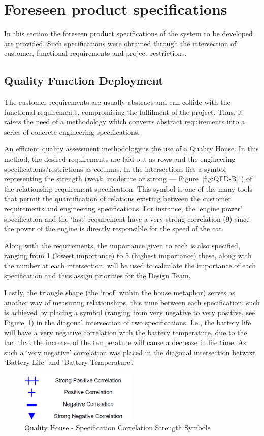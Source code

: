 \section{Foreseen product specifications}%
\label{sec:org31f7574}
In this section the foreseen product specifications of the system to be developed are provided. Such specifications were obtained through the intersection of customer, functional requirements and project restrictions.
\subsection{Quality Function Deployment}%
\label{sec:qfd}
The customer requirements are usually abstract and can collide with the functional requirements, compromising the fulfilment of the project. Thus, it raises the need of a methodology which converts abstract requirements into a series of concrete engineering specifications.

An efficient quality assessment methodology is the use of a Quality House. In this method, the desired requirements are laid out as rows and the engineering specifications/restrictions as columns. In the intersections lies a symbol representing the strength (weak, moderate or strong --- Figure~\ref{fig:QFD-R} ) of the relationship requirement-specification. This symbol is one of the many tools that permit the quantification of relations existing between the customer requirements and engineering specifications.
For instance, the `engine power' specification and the `fast' requirement have a
very strong correlation (9) since the power of the engine is directly
responsible for the speed of the car.

Along with the requirements, the importance given to each is also specified, ranging from 1 (lowest importance) to 5 (highest importance) these, along with the number at each intersection, will be used to calculate the importance of each specification and thus assign priorities for the Design Team.

Lastly, the triangle shape (the `roof' within the house metaphor) serves as another way of measuring relationships, this time between each specification: such is achieved by placing a symbol (ranging from very negative to very positive, see Figure~\ref{fig:QFD-Roof}) in the diagonal intersection of two specifications. 
I.e., the battery life will have a very negative correlation with the battery temperature, due to the fact that the increase of the temperature will cause a decrease in life time. As such a `very negative' correlation was placed in the diagonal intersection betwixt `Battery Life' and `Battery Temperature'. 
\begin{figure}[!htbp]
   \centering
       \includegraphics[page=1,width=0.5\textwidth]{sec/img/Roof_Symbols.png} 
 \caption{Quality House - Specification Correlation Strength Symbols}%
\label{fig:QFD-Roof}
\end{figure}


